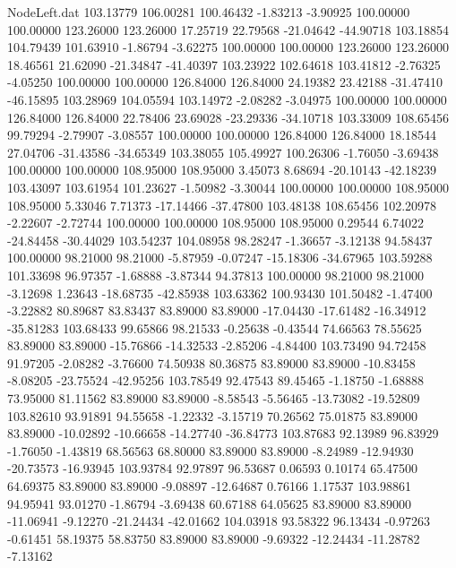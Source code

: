 \begin{filecontents}{NodeLeft.dat}
 103.13779  106.00281  100.46432    -1.83213   -3.90925  100.00000  100.00000  123.26000  123.26000   17.25719   22.79568  -21.04642  -44.90718
 103.18854  104.79439  101.63910    -1.86794   -3.62275  100.00000  100.00000  123.26000  123.26000   18.46561   21.62090  -21.34847  -41.40397
 103.23922  102.64618  103.41812    -2.76325   -4.05250  100.00000  100.00000  126.84000  126.84000   24.19382   23.42188  -31.47410  -46.15895
 103.28969  104.05594  103.14972    -2.08282   -3.04975  100.00000  100.00000  126.84000  126.84000   22.78406   23.69028  -23.29336  -34.10718
 103.33009  108.65456   99.79294    -2.79907   -3.08557  100.00000  100.00000  126.84000  126.84000   18.18544   27.04706  -31.43586  -34.65349
 103.38055  105.49927  100.26306    -1.76050   -3.69438  100.00000  100.00000  108.95000  108.95000    3.45073    8.68694  -20.10143  -42.18239
 103.43097  103.61954  101.23627    -1.50982   -3.30044  100.00000  100.00000  108.95000  108.95000    5.33046    7.71373  -17.14466  -37.47800
 103.48138  108.65456  102.20978    -2.22607   -2.72744  100.00000  100.00000  108.95000  108.95000    0.29544    6.74022  -24.84458  -30.44029
 103.54237  104.08958   98.28247    -1.36657   -3.12138   94.58437  100.00000   98.21000   98.21000   -5.87959   -0.07247  -15.18306  -34.67965
 103.59288  101.33698   96.97357    -1.68888   -3.87344   94.37813  100.00000   98.21000   98.21000   -3.12698    1.23643  -18.68735  -42.85938
 103.63362  100.93430  101.50482    -1.47400   -3.22882   80.89687   83.83437   83.89000   83.89000  -17.04430  -17.61482  -16.34912  -35.81283
 103.68433   99.65866   98.21533    -0.25638   -0.43544   74.66563   78.55625   83.89000   83.89000  -15.76866  -14.32533   -2.85206   -4.84400
 103.73490   94.72458   91.97205    -2.08282   -3.76600   74.50938   80.36875   83.89000   83.89000  -10.83458   -8.08205  -23.75524  -42.95256
 103.78549   92.47543   89.45465    -1.18750   -1.68888   73.95000   81.11562   83.89000   83.89000   -8.58543   -5.56465  -13.73082  -19.52809
 103.82610   93.91891   94.55658    -1.22332   -3.15719   70.26562   75.01875   83.89000   83.89000  -10.02892  -10.66658  -14.27740  -36.84773
 103.87683   92.13989   96.83929    -1.76050   -1.43819   68.56563   68.80000   83.89000   83.89000   -8.24989  -12.94930  -20.73573  -16.93945
 103.93784   92.97897   96.53687     0.06593    0.10174   65.47500   64.69375   83.89000   83.89000   -9.08897  -12.64687    0.76166    1.17537
 103.98861   94.95941   93.01270    -1.86794   -3.69438   60.67188   64.05625   83.89000   83.89000  -11.06941   -9.12270  -21.24434  -42.01662
 104.03918   93.58322   96.13434    -0.97263   -0.61451   58.19375   58.83750   83.89000   83.89000   -9.69322  -12.24434  -11.28782   -7.13162

\end{filecontents}
